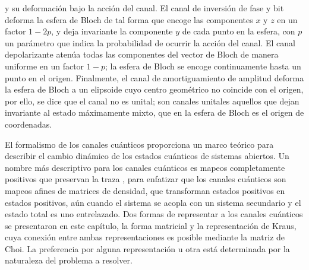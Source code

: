y su deformación bajo la acción del canal. 
El canal de inversión de fase y bit deforma la
esfera de Bloch de tal forma que encoge las componentes $x$ y $z$ en 
un factor $1-2p$, y deja invariante la componente
$y$ de cada punto en la esfera, con $p$ un parámetro que indica la
probabilidad de ocurrir la acción del canal. 
El canal depolarizante 
atenúa todas las componentes del vector de Bloch de manera uniforme
en un factor $1-p$; la esfera de Bloch se encoge
continuamente hasta un punto en el origen. Finalmente, 
el canal de amortiguamiento de amplitud deforma la esfera de Bloch
a un elipsoide cuyo centro geométrico no coincide con el origen, por
ello, se dice que el canal no es unital; son canales unitales aquellos 
que dejan invariante al estado máximamente mixto, 
que en la esfera de Bloch es el origen de coordenadas.

El formalismo de los canales cuánticos proporciona un marco 
teórico para describir el cambio dinámico de los estados cuánticos 
de sistemas abiertos. Un nombre más descriptivo para 
los canales cuánticos es mapeos completamente 
positivos que preservan la traza \cite{bengtsson_zyczkowski_2017},
para enfatizar que los canales cuánticos son mapeos afines de matrices de 
densidad, que transforman estados positivos en estados positivos,
aún cuando el sistema se acopla con un sistema secundario y el estado
total es uno entrelazado. 
Dos formas de representar a los canales cuánticos
se presentaron en este capítulo, la forma matricial y 
la representación de Kraus, cuya conexión entre ambas representaciones
es posible mediante la matriz de Choi.
La preferencia por alguna representación u otra está determinada 
por la naturaleza del problema a resolver. 
